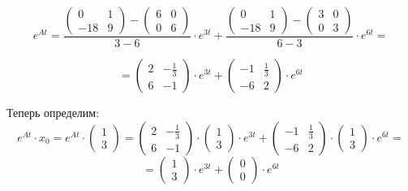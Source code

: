 \begin{displaymath}
e^{At} = \frac{\begin{pmatrix}
0 & 1
\\
-18 & 9
\end{pmatrix} - \begin{pmatrix}
6 & 0
\\
0 & 6
\end{pmatrix}}{3 - 6} \cdot e^{3t} + \frac{\begin{pmatrix}
0 & 1
\\
-18 & 9
\end{pmatrix} - \begin{pmatrix}
3 & 0
\\
0 & 3
\end{pmatrix}}{6 - 3} \cdot e^{6t} = 
\end{displaymath}

\begin{displaymath}
= \begin{pmatrix}
2 & - \frac{1}{3}
\\
6 & -1
\end{pmatrix} \cdot e^{3t} + \begin{pmatrix}
-1 & \frac{1}{3}
\\
-6 & 2
\end{pmatrix} \cdot e^{6t}
\end{displaymath}

Теперь определим:
\begin{displaymath}
e^{At} \cdot x_0 = e^{At} \cdot \begin{pmatrix}
1
\\
3
\end{pmatrix} = \begin{pmatrix}
2 & - \frac{1}{3}
\\
6 & -1
\end{pmatrix} \cdot \begin{pmatrix}
1
\\
3
\end{pmatrix} \cdot e^{3t} + \begin{pmatrix}
-1 & \frac{1}{3}
\\
-6 & 2
\end{pmatrix} \cdot \begin{pmatrix}
1
\\
3
\end{pmatrix} \cdot e^{6t} = 
\end{displaymath} 
\begin{displaymath}
= \begin{pmatrix}
1
\\
3
\end{pmatrix} \cdot e^{3t} +
\begin{pmatrix}
0
\\
0
\end{pmatrix} \cdot e^{6t}
\end{displaymath}

